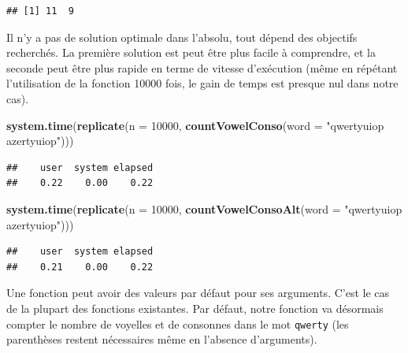 \documentclass[]{book}
\newenvironment{Shaded}{\begin{snugshade}}{\end{snugshade}}
\newcommand{\DataTypeTok}[1]{\textcolor[rgb]{0.13,0.29,0.53}{#1}}
\newcommand{\DecValTok}[1]{\textcolor[rgb]{0.00,0.00,0.81}{#1}}
\newcommand{\KeywordTok}[1]{\textcolor[rgb]{0.13,0.29,0.53}{\textbf{#1}}}
\newcommand{\NormalTok}[1]{#1}
\newcommand{\StringTok}[1]{\textcolor[rgb]{0.31,0.60,0.02}{#1}}
\begin{document}
\begin{verbatim}
## [1] 11  9
\end{verbatim}

Il n'y a pas de solution optimale dans l'absolu, tout dépend des objectifs recherchés. La première solution est peut être plus facile à comprendre, et la seconde peut être plus rapide en terme de vitesse d'exécution (même en répétant l'utilisation de la fonction 10000 fois, le gain de temps est presque nul dans notre cas).

\begin{Shaded}
\begin{Highlighting}[]
\KeywordTok{system.time}\NormalTok{(}\KeywordTok{replicate}\NormalTok{(}\DataTypeTok{n =} \DecValTok{10000}\NormalTok{, }\KeywordTok{countVowelConso}\NormalTok{(}\DataTypeTok{word =} \StringTok{"qwertyuiop azertyuiop"}\NormalTok{)))}
\end{Highlighting}
\end{Shaded}

\begin{verbatim}
##    user  system elapsed 
##    0.22    0.00    0.22
\end{verbatim}

\begin{Shaded}
\begin{Highlighting}[]
\KeywordTok{system.time}\NormalTok{(}\KeywordTok{replicate}\NormalTok{(}\DataTypeTok{n =} \DecValTok{10000}\NormalTok{, }\KeywordTok{countVowelConsoAlt}\NormalTok{(}\DataTypeTok{word =} \StringTok{"qwertyuiop azertyuiop"}\NormalTok{)))}
\end{Highlighting}
\end{Shaded}

\begin{verbatim}
##    user  system elapsed 
##    0.21    0.00    0.22
\end{verbatim}

Une fonction peut avoir des valeurs par défaut pour ses arguments. C'est le cas de la plupart des fonctions existantes. Par défaut, notre fonction va désormais compter le nombre de voyelles et de consonnes dans le mot \texttt{qwerty} (les parenthèses restent nécessaires même en l'absence d'arguments).
\end{document}
